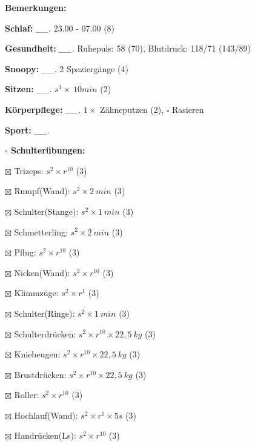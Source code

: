 \documentclass[10pt,a4paper]{article}
\newcommand\prop[1] {{\color {alizarin} {\bf #1}}}             %
\newcommand\mand[1] {{\color {burntorange} {\bf #1}}}          %
\newcommand\topspace{\vskip -15pt \hskip 20pt}
\newcommand\n[1] { {\sl #1.} \hskip 5pt }
\begin{document}
\begin{mdframed}[style=daystyle]
  \begin{labeling}{{\mand {Bemerkungen:}}}
    \setlength\itemsep{-3pt}
  \item[{\mand {Schlaf:}}]        \n{\_\_} 23.00 - 07.00 (8)
  \item[{\mand {Gesundheit:}}]    \n{\_\_} Ruhepuls: 58 (70), Blutdruck: 118/71 (143/89)
  \item[{\mand {Snoopy:}}]        \n{\_\_} 2 Spaziergänge (4) 
  \item[{\mand {Sitzen:}}]        \n{\_\_} $s^1 \times\ 10 min$ (2)
  \item[{\mand {Körperpflege:}}]  \n{\_\_} $1 \times$ Zähneputzen (2), $\square$ Rasieren
  \item[{\mand {Sport:}}]         \n{\_\_}
    \topspace
    \begin{minipage}{0.75\textwidth}  
      \begin{labeling}{\prop {$\square$ {Schulterübungen:}}} 
        \setlength\itemsep{-3pt}
      \item[$\boxtimes$ Trizeps:]          $s^2 \times r^{10}$ (3)
      \item[$\boxtimes$ Rumpf(Wand):]      $s^2 \times 2\ min$ (3)
      \item[$\boxtimes$ Schulter(Stange):] $s^2 \times 1\ min$ (3)
      \item[$\boxtimes$ Schmetterling:]    $s^2 \times 2\ min$ (3)
      \item[$\boxtimes$ Pflug:]            $s^2 \times r^{10}$ (3)
      \item[$\boxtimes$ Nicken(Wand):]     $s^2 \times r^{10}$ (3)
      \item[$\boxtimes$ Klimmzüge:]        $s^2 \times r^1$ (3)
      \item[$\boxtimes$ Schulter(Ringe):]  $s^2 \times 1\ min$ (3)
      \item[$\boxtimes$ Schulterdrücken:]  $s^2 \times r^{10} \times 22,5\ kg$ (3)
      \item[$\boxtimes$ Kniebeugen:]       $s^2 \times r^{10} \times 22,5\ kg$ (3)
      \item[$\boxtimes$ Brustdrücken:]     $s^2 \times r^{10} \times 22,5\ kg$ (3)
      \item[$\boxtimes$ Roller:]           $s^2 \times r^{10}$ (3)
      \item[$\boxtimes$ Hochlauf(Wand):]   $s^2 \times r^{1} \times 5s$ (3)
      \item[$\boxtimes$ Handrücken(Ls):]   $s^2 \times r^{10}$ (3)

\end{labeling}
\end{minipage}
\end{labeling}
\end{mdframed}
\end{document}
